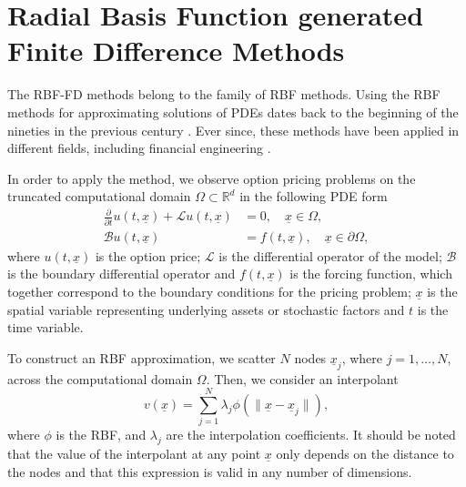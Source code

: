 \documentclass{UUThesisTemplate}
\begin{document}
\chapter{Radial Basis Function generated Finite Difference Methods}
\label{ch:rbffd}
\par The RBF-FD methods belong to the family of RBF methods. Using the RBF methods for approximating solutions of PDEs dates back to the beginning of the nineties in the previous century \cite{kansa1990multiquadrics2, kansa1990multiquadrics1}. Ever since, these methods have been applied in different fields, including financial engineering \cite{pettersson2008improved, fasshauer2004using, hon1999radial}. 
\par In order to apply the method, we observe option pricing problems on the truncated computational domain $\Omega\subset \mathbb{R}^{d}$ in the following PDE form
\begin{align}
\frac{\partial}{\partial t}u(t,\underline{x}) + \mathcal{L}u(t,\underline{x}) &= 0, \quad \underline{x} \in \Omega, \label{eqPDE} \\
\mathcal{B}u(t,\underline{x}) &= f(t,\underline{x}), \quad \underline{x} \in \partial \Omega, \label{eqBC}
\end{align}
where $u(t,\underline{x})$ is the option price; $\mathcal{L}$ is the differential operator of the model; $\mathcal{B}$ is the boundary differential operator and $f(t,\underline{x})$ is the forcing function, which together correspond to the boundary conditions for the pricing problem; $\underline{x}$ is the spatial variable representing underlying assets or stochastic factors and $t$ is the time variable.
\par To construct an RBF approximation, we scatter $N$ nodes $\underline{x}_j$, where $j=1,\ldots,N$, across the computational domain $\Omega$. Then, we consider an interpolant
\begin{equation}
\label{eq:RBFint}
	v(\underline{x}) = \sum_{j=1}^N \lambda_j \phi(\|\underline{x}-\underline{x}_j\|),
\end{equation}
where $\phi$ is the RBF, and $\lambda_j$ are the interpolation coefficients. It should be noted that the value of the interpolant at any point $\underline{x}$ only depends on the distance to the nodes and that this expression is valid in any number of dimensions. 
\end{document}
